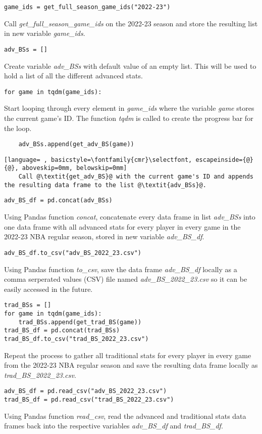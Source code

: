 \documentclass{article}
\begin{document}
\begin{lstlisting}
game_ids = get_full_season_game_ids("2022-23")
\end{lstlisting}
Call \textit{get_full_season_game_ids} on the 2022-23 season and store the resulting list in new variable \textit{game_ids}.
\begin{lstlisting}
adv_BSs = []
\end{lstlisting}
Create variable \textit{adv_BSs} with default value of an empty list. This will be used to hold a list of all the different advanced stats.
\begin{lstlisting}
for game in tqdm(game_ids):
\end{lstlisting}
Start looping through every element in \textit{game_ids} where the variable \textit{game} stores the current game's ID. The function \textit{tqdm} is called to create the progress bar for the loop.
\begin{lstlisting}
    adv_BSs.append(get_adv_BS(game))
\end{lstlisting}
\begin{lstlisting}[language= , basicstyle=\fontfamily{cmr}\selectfont, escapeinside={@}{@}, aboveskip=0mm, belowskip=0mm]
    Call @\textit{get_adv_BS}@ with the current game's ID and appends the resulting data frame to the list @\textit{adv_BSs}@.
\end{lstlisting}
\begin{lstlisting}
adv_BS_df = pd.concat(adv_BSs)
\end{lstlisting}
Using Pandas function \textit{concat}, concatenate every data frame in list \textit{adv_BSs} into one data frame with all advanced stats for every player in every game in the 2022-23 NBA regular season, stored in new variable \textit{adv_BS_df}.
\begin{lstlisting}
adv_BS_df.to_csv("adv_BS_2022_23.csv")
\end{lstlisting}
Using Pandas function \textit{to_csv}, save the data frame \textit{adv_BS_df} locally as a comma serperated values (CSV) file named \textit{adv_BS_2022_23.csv} so it can be easily accessed in the future.
\begin{lstlisting}
trad_BSs = []
for game in tqdm(game_ids):
    trad_BSs.append(get_trad_BS(game))
trad_BS_df = pd.concat(trad_BSs)
trad_BS_df.to_csv("trad_BS_2022_23.csv")
\end{lstlisting}
Repeat the process to gather all traditional stats for every player in every game from the 2022-23 NBA regular season and save the resulting data frame locally as \textit{trad_BS_2022_23.csv}.
\begin{lstlisting}
adv_BS_df = pd.read_csv("adv_BS_2022_23.csv")
trad_BS_df = pd.read_csv("trad_BS_2022_23.csv")
\end{lstlisting}
Using Pandas function \textit{read_csv}, read the advanced and traditional stats data frames back into the respective variables \textit{adv_BS_df} and \textit{trad_BS_df}.
\end{document}
